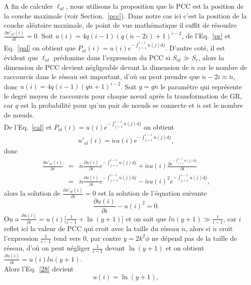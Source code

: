 A fin de calculer $\ell_{al}$, nous utilisons la proposition que le PCC est la position de la couche maximale (voir Section.~\ref{pcc}). Dans notre cas ici c'est la position de la couche aléatoire maximale, de point de vue mathématique il suffit de résoudre $\frac{\partial n'_{al}(i)}{di}=0$. Soit $u(i)=4q(i-1)(q(\acute{n}-2i)+1)^{i-2}$, de l'Eq.~\ref{pr} et Eq.~\ref{pal} on obtient que $P_{al}(i)=u(i)e^{-\int_{j=1}^{i-1}u(j)dj}$. D'autre coté, il est évident que $\ell_{al}$ prédomine dans l'expression du PCC si $S_{al}\gg S_r$, alors la dimension de PCC devient négligeable devant la dimension de $\acute{n}$ car le nombre de raccourcis dans le réseau est important, d'où on peut prendre que $\acute{n}-2i\approx \acute{n}$, donc
$u(i)=4q(i-1)(q\acute{n}+1)^{i-2}$. Soit  $y=q\acute{n}$ le paramètre qui représente le degré moyen de raccourcis pour chaque nœud après la transformation de GR, car $q$ est la probabilité pour qu'un pair de nœuds se connecte et $\acute{n}$ est le nombre de nœuds.\\
 De l'Eq.~\ref{cal} et $P_{al}(i)=u(i)e^{-\int_{j=1}^{i-1}u(j)dj}$  on obtient
\begin{eqnarray}
n'_{al}(i)=\acute{n}u(i)e^{-\int_{j=1}^{i-1}u(j)dj},
\end{eqnarray}
donc 
\begin{eqnarray}
\frac{\partial n'_{al}(i)}{\partial i}&=&\acute{n}\frac{\partial u(i)}{\partial i}e^{-\int_{j=1}^{i-1}u(j)dj}+\acute{n}u(i)\frac{\partial e^{-\int_{j=1}^{i-1}u(j)dj}}{\partial i}\\\nonumber
&=&\acute{n}\frac{\partial u(i)}{\partial i}e^{-\int_{j=1}^{i-1}u(j)dj}-\acute{n}u(i)^2e^{-\int_{j=1}^{i-1}u(j)dj},\nonumber
\end{eqnarray}
alors la solution de $\frac{\partial n'_{al}(i)}{\partial i}=0$ est la solution de l'équation suivante
\begin{equation}
\frac{\partial u(i)}{\partial i}-u(i)^2=0.
\label{28}
\end{equation}
On a $\frac{\partial u(i)}{\partial i}=u(i)\big[\frac{1}{i-1}+\ln(y+1)\big]$ et on sait que $ln(y+1)\gg\frac{1}{i-1}$, car $i$ reflet ici la valeur de PCC qui croit avec la taille 
du réseau $\acute{n}$, alors si $\acute{n}$ croit l'expression $\frac{1}{i-1}$ tend vers $0$, par contre $y=2k^2\phi$ ne dépend pas de la taille de réseau, d'où on peut négliger $\frac{1}{i-1}$ devant
$\ln(y+1)$ et  on obtient $\frac{\partial u(i)}{\partial i}=u(i)ln(y+1)$.\\
Alors l'Eq.~\ref{28} devient
\begin{equation}
u(i)=\ln(y+1),
\label{29}
\end{equation}
